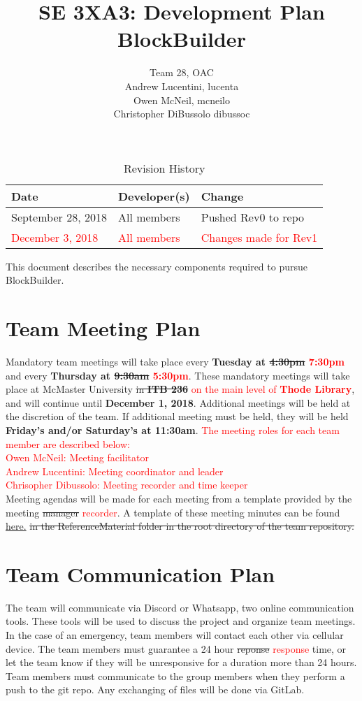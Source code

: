 \documentclass{article}
\title{SE 3XA3: Development Plan\\BlockBuilder}
\author{Team 28, OAC
		\\ Andrew Lucentini, lucenta
		\\ Owen McNeil, mcneilo
		\\ Christopher DiBussolo dibussoc
}
\date{}
\begin{document}
\begin{table}[hp]
\caption{Revision History} \label{TblRevisionHistory}
\begin{tabularx}{\textwidth}{llX}
\toprule
\textbf{Date} & \textbf{Developer(s)} & \textbf{Change}\\
\midrule
September 28, 2018 & All members & Pushed Rev0 to repo\\
\textcolor{red}{December 3, 2018 } & \textcolor{red}{All members} & \textcolor{red}{ Changes made for Rev1}\\
\bottomrule
\end{tabularx}
\end{table}

\newpage

\maketitle

This document describes the necessary components required to pursue BlockBuilder.

\section{Team Meeting Plan}
Mandatory team meetings will take place every \textbf{Tuesday at \sout{4:30pm} \textcolor{red}{7:30pm}} and every \textbf{Thursday at \sout{9:30am} \textcolor{red}{5:30pm}}. These mandatory meetings will take place at McMaster University \sout{in \textbf{ITB 236}} \textcolor{red}{on the main level of \textbf{Thode Library}}, and will continue until \textbf{December 1, 2018}. Additional meetings will be held at the discretion of the team. If additional meeting must be held, they will be held \textbf{Friday's and/or Saturday's at 11:30am}. \textcolor{red}{The meeting roles for each team member are described below:
\medskip
\\Owen McNeil: Meeting facilitator\\
Andrew Lucentini: Meeting coordinator and leader\\
Chrisopher Dibussolo: Meeting recorder and time keeper
}\\


Meeting agendas will be made for each meeting from a template provided by the meeting \sout{manager} \textcolor{red}{recorder}. A template of these meeting minutes can be found  \href{../../ReferenceMaterial/Meeting\_Agenda Template.docx}{here.} \sout{in the ReferenceMaterial folder in the root directory of the team repository.} 
\section{Team Communication Plan}
The team will communicate via Discord or Whatsapp, two online communication tools. These tools will be used to discuss the project and organize team meetings. In the case of an emergency, team members will contact each other via cellular device. The team members must guarantee a 24 hour \sout{reponse} \textcolor{red}{ response} time, or let the team know if they will be unresponsive for a duration more than 24 hours. Team members must communicate to the group members when they perform a push to the git repo. Any exchanging of files will be done via GitLab.
\end{document}
